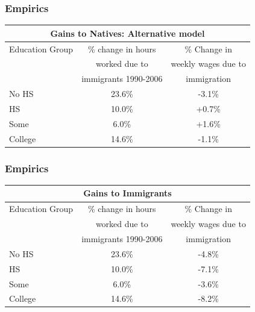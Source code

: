 \documentclass{beamer}
\begin{document}
\begin{frame}
\frametitle{Empirics}
\begin{table}
\centering
\begin{tabular}{lcc}
\multicolumn{3}{c}{Gains to Natives: Alternative model}\\
   \hline
  \hline
Education Group & \% change in hours   & \% Change in \\
 &  worked due to  & weekly wages due to \\
  & immigrants 1990-2006 & immigration\\
  \hline
 No HS & 23.6\% & -3.1\% \\
 HS & 10.0\% & +0.7\% \\
 Some & 6.0\% & +1.6\% \\
 College & 14.6\% & -1.1\% \\
   \hline
  \hline
\end{tabular}
\end{table}
\end{frame}

\begin{frame}
\frametitle{Empirics}
\begin{table}
\centering
\begin{tabular}{lcc}
\multicolumn{3}{c}{Gains to Immigrants}\\
   \hline
  \hline
Education Group & \% change in hours   & \% Change in \\
 &  worked due to  & weekly wages due to \\
  & immigrants 1990-2006 & immigration\\
  \hline
 No HS & 23.6\% & -4.8\% \\
 HS & 10.0\% & -7.1\% \\
 Some & 6.0\% & -3.6\% \\
 College & 14.6\% & -8.2\% \\
   \hline
  \hline
\end{tabular}
\end{table}
\end{frame}
\end{document}
